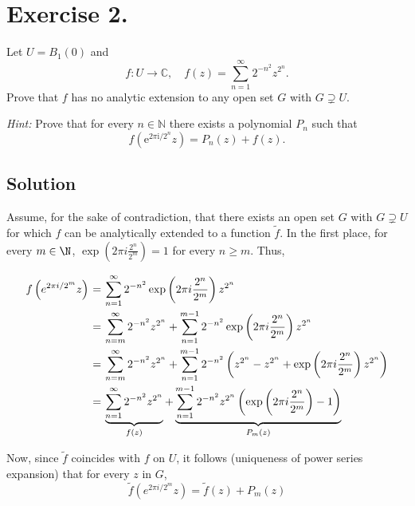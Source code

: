 \section*{Exercise 2.}

Let $U = B_{1}(0)$ and 
\[
f : U \to \mathbb{C}, \quad f(z) = \sum_{n=1}^{\infty} 2^{-n^{2}} z^{2^{n}}.
\]
Prove that $f$ has no analytic extension to any open set $G$ with $G \supsetneq U$.

\textit{Hint:} Prove that for every $n \in \mathbb{N}$ there exists a polynomial $P_{n}$ such that
\[
f \left( \mathrm{e}^{2 \pi \mathrm{i} / 2^{n}} z \right) = P_{n}(z) + f(z).
\]

\subsection*{Solution}

Assume, for the sake of contradiction, that there exists an open set $G$ with $G \supsetneq U$ for which $f$ can be analytically extended to a function $\tilde{f}$. In the first place, for every $m\in \N$, $\exp\left( 2\pi i \frac{2^n}{2^m} \right) = 1$ for every $n \geq m$. Thus,
\[ \everymath{\displaystyle}
\arraycolsep=1.8pt\def\arraystretch{2.5}
\begin{array}{rcl}
    f\left( e^{2\pi i / 2^m } z \right) & = & \sum_{n = 1}^{\infty} 2^{-n^2} \exp\left( 2\pi i \frac{2^n}{2^m} \right) z^{2^n}\\
    & = & \sum_{n = m}^{\infty} 2^{-n^2} z^{2^n} + \sum_{n = 1}^{m-1} 2^{-n^2} \exp\left( 2\pi i \frac{2^n}{2^m} \right) z^{2^n}\\
    & = & \sum_{n = m}^{\infty} 2^{-n^2} z^{2^n} + \sum_{n = 1}^{m-1} 2^{-n^2} \left( z^{2^n} - z^{2^n} + \exp\left( 2\pi i \frac{2^n}{2^m} \right) z^{2^n} \right)\\
    & = & \underbrace{\sum_{n = 1}^{\infty} 2^{-n^2} z^{2^n}}_{f(z)} + \underbrace{\sum_{n = 1}^{m-1} 2^{-n^2} z^{2^n} \left( \exp\left( 2\pi i \frac{2^n}{2^m} \right) - 1 \right)}_{P_m(z)}
\end{array} \]

Now, since $ \tilde{f}$ coincides with $f$ on $U$, it follows (uniqueness of power series expansion) that for every $z$ in $G$, 
\[  \tilde{f}(e^{2\pi i / 2^m } z) = \tilde{f}(z) + P_m(z) \]

